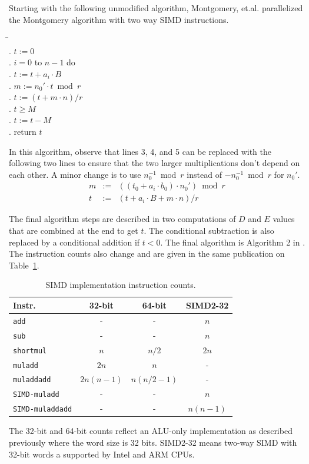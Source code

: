 \documentclass[twocolumn]{svjour3}          %
\begin{document}
Starting with the following unmodified algorithm,
Montgomery, et.al. parallelized the Montgomery algorithm with two way SIMD instructions.
%
\begin{tabbing}
\hspace*{0.2in} \= \hspace*{0.5in}\=\\
. $t := 0$ \\
. \bfor $i=0$ to $n-1$ do \\
. \> $t := t + a_i\cdot B$ \\
. \> $m := n_0' \cdot t \bmod r$ \\
. \> $t := (t + m\cdot n)/r$ \\
. \bif $t \geq M$ \bthen \\
. \> $t := t - M$ \\
. return $t$
\end{tabbing}

In this algorithm, observe that lines 3, 4, and 5 can be replaced with the following two lines
to ensure that the two larger multiplications don't depend on each other.
A minor change is to use $n_0^{-1} \bmod r$ instead of $-n_0^{-1} \bmod r$ for $n_0'$.
\begin{eqnarray*}
m & := &  ((t_0 + a_i\cdot b_0)\cdot n_0') \bmod r \\
t  & := & (t + a_i\cdot B + m\cdot n) / r
\end{eqnarray*}

The final algorithm steps are described in two computations of $D$ and $E$ values that are
combined at the end to get $t$. The conditional subtraction is also replaced by a conditional addition if $t<0$.
The final algorithm is Algorithm 2 in \cite{BMZS13:Montgomery}.
The instruction counts also change and are given in the same publication on Table~\ref{simdCounts}.

\begin{table}
\caption{SIMD implementation instruction counts.}
\label{simdCounts}
\begin{tabular}{|l||c|c|c|} \hline
Instr. & 32-bit & 64-bit & SIMD2-32 \\
\hline\hline
\texttt{add} & - & - & $n$ \\
\texttt{sub} & - & - & $n$ \\
\texttt{shortmul} & $n$ & $n/2$ & $2n$ \\
\texttt{muladd} & $2n$ & $n$ & - \\
\texttt{muladdadd} & $2n(n-1)$ & $n(n/2-1)$ & - \\
\texttt{SIMD-muladd} & - & - & $n$ \\
\texttt{SIMD-muladdadd} & - & - & $n(n-1)$ \\
\hline
\end{tabular}
\end{table}
%
\noindent
The 32-bit and 64-bit counts reflect an ALU-only implementation as described previously where the word size is 32 bits.
SIMD2-32 means two-way SIMD with 32-bit words a supported by Intel and ARM CPUs.
\end{document}
